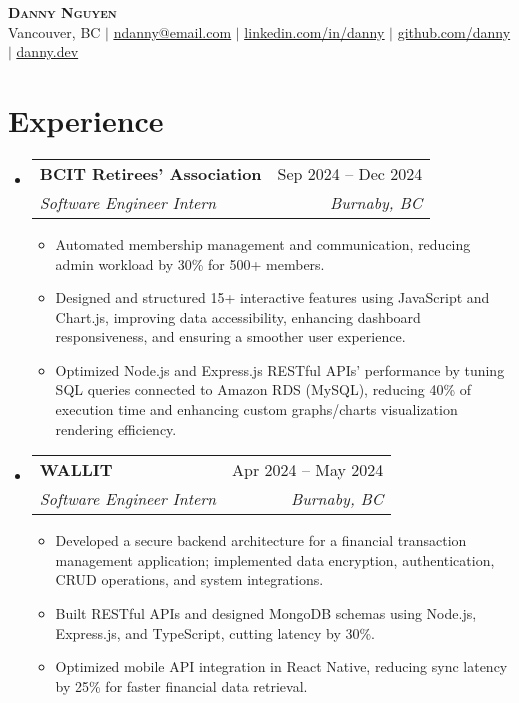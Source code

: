 \documentclass[letterpaper,11pt]{article}
\makeatletter
\newcommand{\resumeItem}[1]{
\item\small{
{#1 \vspace{-2pt}}
}
}
\newcommand{\resumeSubheading}[4]{
\vspace{-2pt}\item
\begin{tabular*}{0.97\textwidth}[t]{l@{\extracolsep{\fill}}r}
\textbf{#1} & #2 \\
\textit{\small#3} & \textit{\small #4} \\
\end{tabular*}\vspace{-7pt}
}
\newcommand{\resumeSubHeadingListStart}{\begin{itemize}[leftmargin=0.15in, label={}]}
\newcommand{\resumeSubHeadingListEnd}{\end{itemize}}
\newcommand{\resumeItemListStart}{\begin{itemize}}
\newcommand{\resumeItemListEnd}{\end{itemize}\vspace{-5pt}}
\makeatother
\begin{document}
\begin{center}
\textbf{\Huge \scshape Danny Nguyen} \\ \vspace{1pt}
\small Vancouver, BC $|$ \href{mailto:ndanny@email.com}{\underline{ndanny@email.com}} $|$
\href{https://linkedin.com/in/danny}{\underline{linkedin.com/in/danny}} $|$
\href{https://github.com/danny}{\underline{github.com/danny}} $|$
\href{https://danny.dev}{\underline{danny.dev}}
\end{center}


\section{Experience}
\resumeSubHeadingListStart
\resumeSubheading{BCIT Retirees’ Association}{Sep 2024 – Dec 2024}{Software Engineer Intern}{Burnaby, BC}
\resumeItemListStart
\resumeItem{Automated membership management and communication, reducing admin workload by 30\% for 500+ members.}
\resumeItem{Designed and structured 15+ interactive features using JavaScript and Chart.js, improving data accessibility, enhancing dashboard responsiveness, and ensuring a smoother user experience.}
\resumeItem{Optimized Node.js and Express.js RESTful APIs’ performance by tuning SQL queries connected to Amazon RDS (MySQL), reducing 40\% of execution time and enhancing custom graphs/charts visualization rendering efficiency.}
\resumeItemListEnd
\resumeSubheading{WALLIT}{Apr 2024 – May 2024}{Software Engineer Intern}{Burnaby, BC}
\resumeItemListStart
\resumeItem{Developed a secure backend architecture for a financial transaction management application; implemented data encryption, authentication, CRUD operations, and system integrations.}
\resumeItem{Built RESTful APIs and designed MongoDB schemas using Node.js, Express.js, and TypeScript, cutting latency by 30\%.}
\resumeItem{Optimized mobile API integration in React Native, reducing sync latency by 25\% for faster financial data retrieval.}
\resumeItemListEnd
\resumeSubHeadingListEnd
\end{document}
